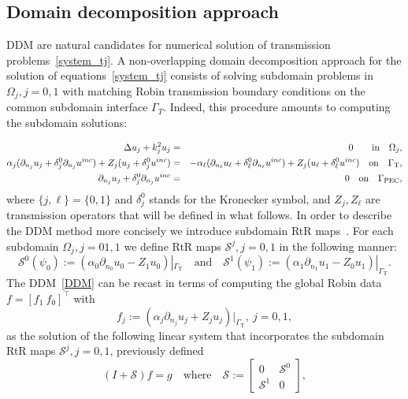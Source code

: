 \documentclass[11pt]{article}
\numberwithin{equation}{section}
\newcommand{\PEC}{\mathrm{PEC}}
\newcommand{\TR}{\mathrm{T}}
\begin{document}
 \subsection{Domain decomposition approach\label{DDMcoat}}

DDM are natural candidates for numerical solution of transmission problems~\eqref{system_tj}. A non-overlapping domain decomposition approach for the solution of equations~\eqref{system_tj} consists of solving subdomain problems in $\Omega_j,j=0,1$ with matching Robin transmission boundary conditions on the common subdomain interface $\Gamma_T$. Indeed, this procedure amounts to computing the subdomain solutions:

\begin{eqnarray}\label{DDM}
  \Delta u_j +k_j^2 u_j &=&0\qquad {\rm in}\quad \Omega_j,\\
  \alpha_j(\partial_{n_j}u_j+\delta_j^0\partial_{n_j}u^{inc})+Z_j(u_j+\delta_j^0 u^{inc})&=&-\alpha_\ell(\partial_{n_\ell}u_\ell+\delta_\ell^0 \partial_{n_\ell}u^{inc})+Z_j (u_\ell+\delta_\ell^0 u^{inc})\quad{\rm on}\quad \Gamma_{\TR},\nonumber\\
  \partial_{n_j}u_j+\delta_j^0\partial_{n_j}u^{inc}&=&0\quad{\rm on}\quad \Gamma_{\PEC},\nonumber
\end{eqnarray}
where $\{j,\ell\}=\{0,1\}$ and $\delta_j^0$ stands for the Kronecker symbol, and $Z_j,Z_\ell$ are transmission operators that will be defined in what follows.  In order to describe the DDM method more concisely we introduce subdomain RtR maps~\cite{Collino1}. For each subdomain $\Omega_j,j=01,1$ we define RtR maps $\mathcal{S}^j,j=0,1$ in the following manner:
\begin{equation}\label{RtRboxj}
   \mathcal{S}^0(\psi_0):=(\alpha_0\partial_{n_0} u_0-Z_1u_0)|_{\Gamma_\TR}\quad\mbox{and}\quad \mathcal{S}^1(\psi_1):=(\alpha_1\partial_{n_1} u_1-Z_0u_1)|_{\Gamma_\TR}.
 \end{equation}
The DDM~\eqref{DDM} can be recast in terms of computing the global Robin data $f=[f_1\ f_0]^\top$ with
\[
f_{j}:=(\alpha_j\partial_{n_j}u_j+Z_j u_j)|_{\Gamma_\TR},\ j=0,1,
\]
as the solution of the following linear system that incorporates the subdomain RtR maps $\mathcal{S}^j,j=0,1$, previously defined
 \begin{equation}\label{ddm}
 (I+\mathcal{S})f=g\quad\mbox{where}\quad \mathcal{S}:=\begin{bmatrix}0&\mathcal{S}^0\\\mathcal{S}^1&0\end{bmatrix},
 \end{equation}
\end{document}
